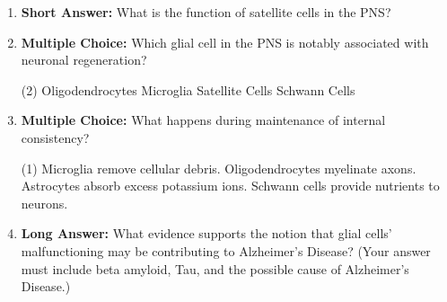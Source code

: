 \begin{enumerate}[label=\textbf{Q2.1.\arabic*}]
            \begin{tasks}[label=\textcolor{draculafg}{(\Alph*)}, item-format=\color{draculafg}, label-width=1.5em, item-indent=1.7em](2)
                  \task Astrocytes
                  \task Ependymal Glia
                  \task Schwann Cells
                  \task Microglia
            \end{tasks}
      \item \textbf{Short Answer:} What is the function of satellite cells in the PNS? \\

      \item \textbf{Multiple Choice:} Which glial cell in the PNS is notably associated with neuronal regeneration?
            \begin{tasks}[label=\textcolor{draculafg}{(\Alph*)}, item-format=\color{draculafg}, label-width=1.5em, item-indent=1.7em](2)
                  \task Oligodendrocytes
                  \task Microglia
                  \task Satellite Cells
                  \task Schwann Cells
            \end{tasks}

      \item \textbf{Multiple Choice:} What happens during maintenance of internal consistency?
            \begin{tasks}[label=\textcolor{draculafg}{(\Alph*)}, item-format=\color{draculafg}, label-width=1.5em, item-indent=1.7em](1)
                  \task Microglia remove cellular debris.
                  \task Oligodendrocytes myelinate axons.
                  \task Astrocytes absorb excess potassium ions.
                  \task Schwann cells provide nutrients to neurons.
            \end{tasks}
      \item \textbf{Long Answer:} What evidence supports the notion that glial cells' malfunctioning may be contributing to Alzheimer's Disease? (Your answer must include beta amyloid, Tau, and the possible cause of Alzheimer's Disease.) \\

\end{enumerate}
\newpage
\squigglyline

